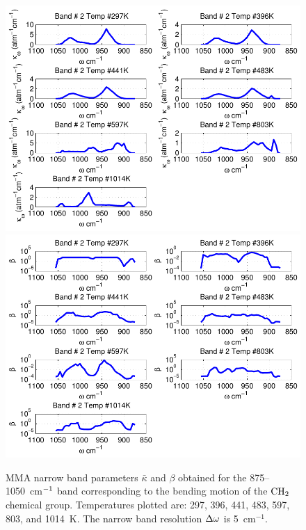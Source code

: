 \begin{figure}[p]
\begin{center}
\includegraphics[width=5.0in]{Figures/MMA_Kappa_Band2_MALKMUS.pdf}
\includegraphics[width=5.0in]{Figures/MMA_Beta_Band2_MALKMUS.pdf}
\end{center}
\caption{MMA narrow band parameters $\bar{\kappa}$ and $\beta$ obtained for the 875--1050~cm$\rm^{-1}$ band corresponding to the bending motion of the $\rm CH_2$ chemical group. Temperatures plotted are: 297, 396, 441, 483, 597, 803, and 1014~K. The narrow band resolution $\Delta \omega$ is 5~cm$^{-1}$.\label{fig:MMA_kappa_beta2}}
\end{figure}

